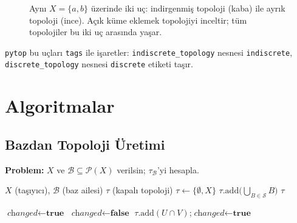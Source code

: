 \begin{figure}[ht]
  \centering
  
  \caption{Aynı $X=\{a,b\}$ üzerinde iki uç: indirgenmiş topoloji (kaba)
    ile ayrık topoloji (ince). Açık küme eklemek topolojiyi inceltir;
    tüm topolojiler bu iki uç arasında yaşar.}
  \label{fig:ch04:kabaince}
\end{figure}

\noindent\texttt{pytop} bu uçları \texttt{tags} ile işaretler:
\texttt{indiscrete\_topology} nesnesi \texttt{indiscrete},
\texttt{discrete\_topology} nesnesi \texttt{discrete} etiketi taşır.

\section{Algoritmalar}

\subsection{Bazdan Topoloji Üretimi}

\textbf{Problem:} $X$ ve $\mathcal{B} \subseteq \mathcal{P}(X)$ verilsin;
$\tau_{\mathcal{B}}$'yi hesapla.

\begin{algorithm}
\caption{Bazdan Topoloji Üretimi}
\label{alg:basis_to_topology}
\begin{algorithmic}[1]
\Require $X$ (taşıyıcı), $\mathcal{B}$ (baz ailesi)
\Ensure $\tau$ (kapalı topoloji)
\State $\tau \leftarrow \{\emptyset, X\}$
    \State $\tau.\text{add}\bigl(\bigcup_{B \in \mathcal{S}} B\bigr)$
\EndFor
\State {}
\Return $\tau$
\end{algorithmic}
\end{algorithm}

\begin{algorithm}
\caption{Kesişim Altında Kapatma}
\begin{algorithmic}[1]
\State $\textit{changed} \leftarrow \textbf{true}$
    \State $\textit{changed} \leftarrow \textbf{false}$
            \State $\tau.\text{add}(U \cap V)$;\quad $\textit{changed} \leftarrow \textbf{true}$
        \EndIf
    \EndFor
\EndWhile
\end{algorithmic}
\end{algorithm}

